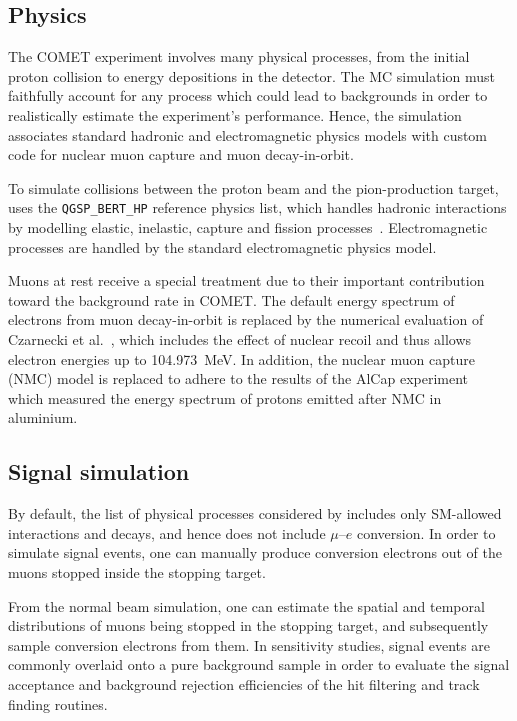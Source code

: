 
\subsection{Physics}
The COMET experiment involves many physical processes, from the initial proton
collision to energy depositions in the detector. The MC simulation must
faithfully account for any process which could lead to backgrounds in order to
realistically estimate the experiment's performance. Hence, the \SimG simulation
associates standard \Geant hadronic and electromagnetic physics models with
custom code for nuclear muon capture and muon decay-in-orbit.

To simulate collisions between the proton beam and the pion-production target,
\SimG uses the \texttt{QGSP\_BERT\_HP} reference physics list, which handles
hadronic interactions by modelling elastic, inelastic, capture and fission
processes~\cite{APOSTOLAKIS2009859}. Electromagnetic processes are handled by
the standard \Geant electromagnetic physics model.

Muons at rest receive a special treatment due to their important contribution
toward the background rate in COMET. The default energy spectrum of electrons
from muon decay-in-orbit is replaced by the numerical evaluation of Czarnecki et
al.~\cite{czarnecki}, which includes the effect of nuclear recoil and thus
allows electron energies up to \SI{104.973}{\MeV}. In addition, the nuclear muon
capture (NMC) model is replaced to adhere to the results of the AlCap
experiment~\cite{PhysRevC.105.035501} which measured the energy spectrum of
protons emitted after NMC in aluminium.




\subsection{Signal simulation}
By default, the list of physical processes considered by \SimG includes only
SM-allowed interactions and decays, and hence does not include $\mu$--$e$
conversion. In order to simulate signal events, one can manually produce
conversion electrons out of the muons stopped inside the stopping target.

From the normal beam simulation, one can estimate the spatial and temporal
distributions of muons being stopped in the stopping target, and subsequently
sample conversion electrons from them. In sensitivity studies, signal events are
commonly overlaid onto a pure background sample in order to evaluate the signal
acceptance and background rejection efficiencies of the hit filtering and track
finding routines.


